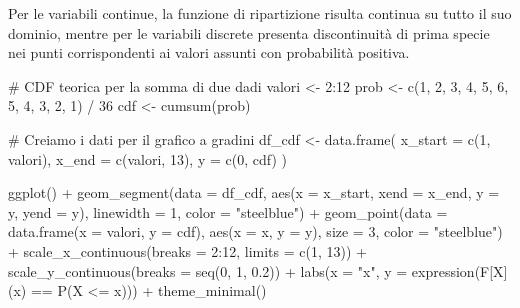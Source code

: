 \documentclass[
  letterpaper,
  DIV=11,
  numbers=noendperiod,
  oneside]{scrreprt}
\newenvironment{Shaded}{\begin{snugshade}}{\end{snugshade}}
\newcommand{\AttributeTok}[1]{\textcolor[rgb]{0.40,0.45,0.13}{#1}}
\newcommand{\CommentTok}[1]{\textcolor[rgb]{0.37,0.37,0.37}{#1}}
\newcommand{\DecValTok}[1]{\textcolor[rgb]{0.68,0.00,0.00}{#1}}
\newcommand{\FloatTok}[1]{\textcolor[rgb]{0.68,0.00,0.00}{#1}}
\newcommand{\FunctionTok}[1]{\textcolor[rgb]{0.28,0.35,0.67}{#1}}
\newcommand{\NormalTok}[1]{\textcolor[rgb]{0.00,0.23,0.31}{#1}}
\newcommand{\OtherTok}[1]{\textcolor[rgb]{0.00,0.23,0.31}{#1}}
\newcommand{\SpecialCharTok}[1]{\textcolor[rgb]{0.37,0.37,0.37}{#1}}
\newcommand{\StringTok}[1]{\textcolor[rgb]{0.13,0.47,0.30}{#1}}
\theoremstyle{definition}
\theoremstyle{plain}
\theoremstyle{definition}
\theoremstyle{remark}
\begin{document}
Per le variabili continue, la funzione di ripartizione risulta continua
su tutto il suo dominio, mentre per le variabili discrete presenta
discontinuità di prima specie nei punti corrispondenti ai valori assunti
con probabilità positiva.

\begin{Shaded}
\begin{Highlighting}[]
\CommentTok{\# CDF teorica per la somma di due dadi}
\NormalTok{valori }\OtherTok{\textless{}{-}} \DecValTok{2}\SpecialCharTok{:}\DecValTok{12}
\NormalTok{prob }\OtherTok{\textless{}{-}} \FunctionTok{c}\NormalTok{(}\DecValTok{1}\NormalTok{, }\DecValTok{2}\NormalTok{, }\DecValTok{3}\NormalTok{, }\DecValTok{4}\NormalTok{, }\DecValTok{5}\NormalTok{, }\DecValTok{6}\NormalTok{, }\DecValTok{5}\NormalTok{, }\DecValTok{4}\NormalTok{, }\DecValTok{3}\NormalTok{, }\DecValTok{2}\NormalTok{, }\DecValTok{1}\NormalTok{) }\SpecialCharTok{/} \DecValTok{36}
\NormalTok{cdf }\OtherTok{\textless{}{-}} \FunctionTok{cumsum}\NormalTok{(prob)}

\CommentTok{\# Creiamo i dati per il grafico a gradini}
\NormalTok{df\_cdf }\OtherTok{\textless{}{-}} \FunctionTok{data.frame}\NormalTok{(}
  \AttributeTok{x\_start =} \FunctionTok{c}\NormalTok{(}\DecValTok{1}\NormalTok{, valori),}
  \AttributeTok{x\_end =} \FunctionTok{c}\NormalTok{(valori, }\DecValTok{13}\NormalTok{),}
  \AttributeTok{y =} \FunctionTok{c}\NormalTok{(}\DecValTok{0}\NormalTok{, cdf)}
\NormalTok{)}

\FunctionTok{ggplot}\NormalTok{() }\SpecialCharTok{+}
  \FunctionTok{geom\_segment}\NormalTok{(}\AttributeTok{data =}\NormalTok{ df\_cdf, }
               \FunctionTok{aes}\NormalTok{(}\AttributeTok{x =}\NormalTok{ x\_start, }\AttributeTok{xend =}\NormalTok{ x\_end, }\AttributeTok{y =}\NormalTok{ y, }\AttributeTok{yend =}\NormalTok{ y),}
               \AttributeTok{linewidth =} \DecValTok{1}\NormalTok{, }\AttributeTok{color =} \StringTok{"steelblue"}\NormalTok{) }\SpecialCharTok{+}
  \FunctionTok{geom\_point}\NormalTok{(}\AttributeTok{data =} \FunctionTok{data.frame}\NormalTok{(}\AttributeTok{x =}\NormalTok{ valori, }\AttributeTok{y =}\NormalTok{ cdf), }
             \FunctionTok{aes}\NormalTok{(}\AttributeTok{x =}\NormalTok{ x, }\AttributeTok{y =}\NormalTok{ y), }
             \AttributeTok{size =} \DecValTok{3}\NormalTok{, }\AttributeTok{color =} \StringTok{"steelblue"}\NormalTok{) }\SpecialCharTok{+}
  \FunctionTok{scale\_x\_continuous}\NormalTok{(}\AttributeTok{breaks =} \DecValTok{2}\SpecialCharTok{:}\DecValTok{12}\NormalTok{, }\AttributeTok{limits =} \FunctionTok{c}\NormalTok{(}\DecValTok{1}\NormalTok{, }\DecValTok{13}\NormalTok{)) }\SpecialCharTok{+}
  \FunctionTok{scale\_y\_continuous}\NormalTok{(}\AttributeTok{breaks =} \FunctionTok{seq}\NormalTok{(}\DecValTok{0}\NormalTok{, }\DecValTok{1}\NormalTok{, }\FloatTok{0.2}\NormalTok{)) }\SpecialCharTok{+}
  \FunctionTok{labs}\NormalTok{(}\AttributeTok{x =} \StringTok{"x"}\NormalTok{, }\AttributeTok{y =} \FunctionTok{expression}\NormalTok{(F[X](x) }\SpecialCharTok{==} \FunctionTok{P}\NormalTok{(X }\SpecialCharTok{\textless{}=}\NormalTok{ x))) }\SpecialCharTok{+}
  \FunctionTok{theme\_minimal}\NormalTok{()}
\end{Highlighting}
\end{Shaded}
\end{document}
